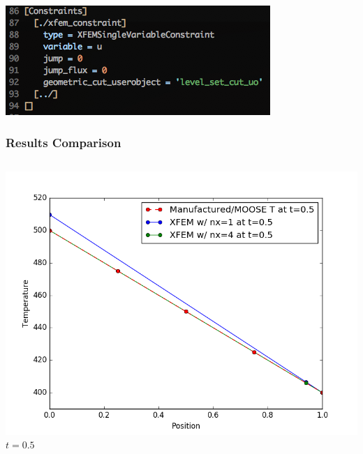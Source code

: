 \documentclass[]{beamer}
\begin{document}
\begin{frame}
\begin{columns}
\begin{center}
			\end{center}
	\end{columns}
	\begin{center}
	\includegraphics[scale=0.4]{figures/1D_xy_h1m/Screen-Constraints-1Dxyh1m}
	\end{center}
\end{frame}

\begin{frame}[t]\frametitle{Results Comparison}
  	\begin{columns}
			\begin{center}
			\includegraphics[scale=0.17]{figures/1D_xy_h1m/1D_xy_homog1mat_u_vs_x_05}\\
			$t=0.5$
			
			\null
			

\end{center}
\end{columns}
\end{frame}
\end{document}
